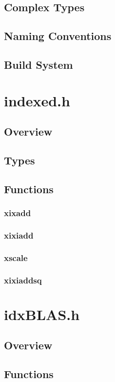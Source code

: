 \documentclass[12pt]{article}
\theoremstyle{plain}
\begin{document}
  \subsection{Complex Types}
  \subsection{Naming Conventions}
  \subsection{Build System}
\section{indexed.h}
  \subsection{Overview}
  \subsection{Types}
  \subsection{Functions}
    \subsubsection{xixadd}
    \subsubsection{xixiadd}
    \subsubsection{xscale}
    \subsubsection{xixiaddsq}
\section{idxBLAS.h}
  \subsection{Overview}
  \subsection{Functions}
\end{document}

